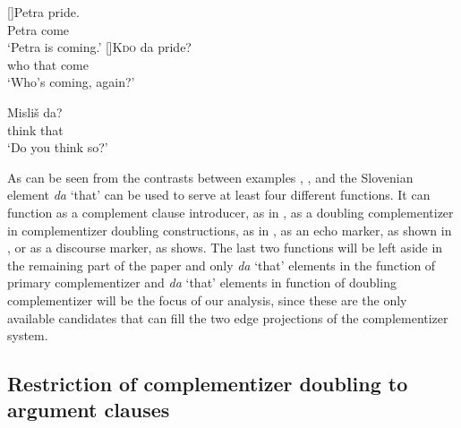 \documentclass[output=paper,
]{langscibook}
\begin{document}
\begin{exe}
 \ex \label{ex:plesnicar:seven}
 \begin{xlist}
 []{\gll Petra	pride.\\
	Petra	come\\
    \trans `Petra is coming.'}
  []{\gll \textsc{Kdo}	da 	pride?\\
  who	that		come\\
 \trans `Who’s coming, again?'}
 \end{xlist}
\end{exe}

\begin{exe} 
\ex \label{ex:plesnicar:eight}
\gll Misliš	da? \\
	think	that\\
\trans `Do you think so?' 
\end{exe}

\noindent As can be seen from the contrasts between examples , ,  and  the Slovenian element \textit{da} `that' can be used to serve at least four different functions. It can function as a complement clause introducer, as in , as a doubling complementizer in complementizer doubling constructions, as in , as an echo marker, as shown in , or as a discourse marker, as  shows. The last two functions will be left aside in the remaining part of the paper and only \textit{da} `that' elements in the function of primary complementizer and \textit{da} `that' elements in function of doubling complementizer will be the focus of our analysis, since these are the only available candidates that can fill the two edge projections of the complementizer system.

\subsection{Restriction of complementizer doubling to argument clauses} \label{s23}
\end{document}
